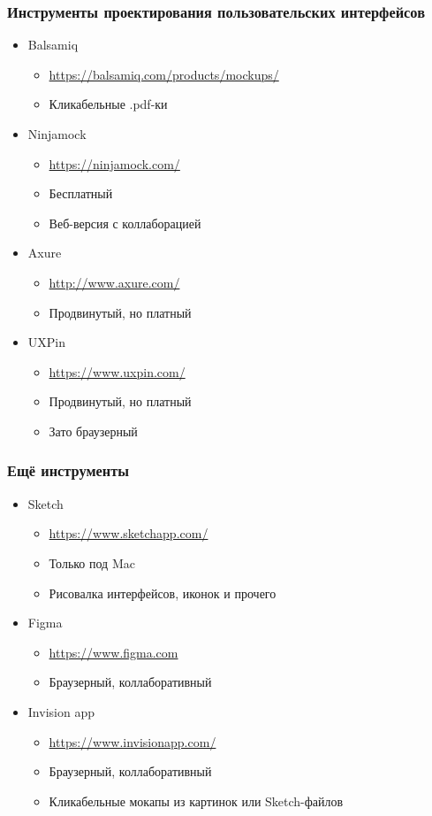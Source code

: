\documentclass[xetex,mathserif,serif]{beamer}
\begin{document}
		\begin{frame}
			\frametitle{Инструменты проектирования пользовательских интерфейсов}
			\begin{itemize}
				\item Balsamiq
				\begin{itemize}
					\item \url{https://balsamiq.com/products/mockups/}
					\item Кликабельные .pdf-ки
				\end{itemize}
				\item Ninjamock
				\begin{itemize}
					\item \url{https://ninjamock.com/}
					\item Бесплатный
					\item Веб-версия с коллаборацией
				\end{itemize}
				\item Axure
				\begin{itemize}
					\item \url{http://www.axure.com/}
					\item Продвинутый, но платный
				\end{itemize}
				\item UXPin
				\begin{itemize}
					\item \url{https://www.uxpin.com/}
					\item Продвинутый, но платный
					\item Зато браузерный
				\end{itemize}
			\end{itemize}
		\end{frame}
	
		\begin{frame}
			\frametitle{Ещё инструменты}
			\begin{itemize}
				\item Sketch
				\begin{itemize}
					\item \url{https://www.sketchapp.com/}
					\item Только под Mac
					\item Рисовалка интерфейсов, иконок и прочего
				\end{itemize}
				\item Figma
				\begin{itemize}
					\item \url{https://www.figma.com}
					\item Браузерный, коллаборативный
				\end{itemize}
				\item Invision app
				\begin{itemize}
					\item \url{https://www.invisionapp.com/}
					\item Браузерный, коллаборативный
					\item Кликабельные мокапы из картинок или Sketch-файлов
				\end{itemize}
			\end{itemize}
		\end{frame}
\end{document}
